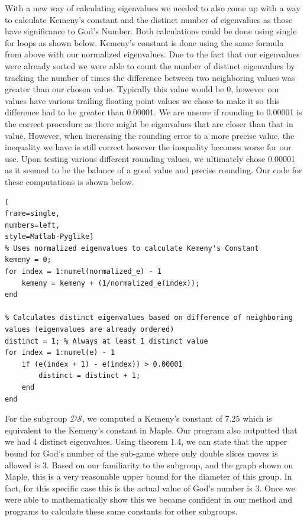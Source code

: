 \documentclass{article}
\begin{document}
With a new way of calculating eigenvalues we needed to also come up with a way to calculate Kemeny's constant and the distinct number of eigenvalues as those have significance to God's Number.  Both calculations could be done using single for loops as shown below.  Kemeny's constant is done using the same formula from above with our normalized eigenvalues.  Due to the fact that our eigenvalues were already sorted we were able to count the number of distinct eigenvalues by tracking the number of times the difference between two neighboring values was greater than our chosen value.  Typically this value would be 0, however our values have various trailing floating point values we chose to make it so this difference had to be greater than 0.00001.  We are unsure if rounding to 0.00001 is the correct procedure as there might be eigenvalues that are closer than that in value.  However, when increasing the rounding error to a more precise value, the inequality we have is still correct however the inequality becomes worse for our use.  Upon testing various different rounding values, we ultimately chose 0.00001 as it seemed to be the balance of a good value and precise rounding. Our code for these computations is shown below.
\begin{lstlisting}[
frame=single,
numbers=left,
style=Matlab-Pyglike]
% Uses normalized eigenvalues to calculate Kemeny's Constant
kemeny = 0;
for index = 1:numel(normalized_e) - 1
    kemeny = kemeny + (1/normalized_e(index));
end

% Calculates distinct eigenvalues based on difference of neighboring values (eigenvalues are already ordered)
distinct = 1; % Always at least 1 distinct value
for index = 1:numel(e) - 1
    if (e(index + 1) - e(index)) > 0.00001
        distinct = distinct + 1;
    end
end
\end{lstlisting}

For the subgroup $\mathcal{DS}$, we computed a Kemeny's constant of 7.25 which is equivalent to the Kemeny's constant in Maple.  Our program also outputted that we had 4 distinct eigenvalues.  Using theorem 1.4, we can state that the upper bound for God's number of the sub-game where only double slices moves is allowed is 3. Based on our familiarity to the subgroup, and the graph shown on Maple, this is a very reasonable upper bound for the diameter of this group.  In fact, for this specific case this is the actual value of God's number is 3.  Once we were able to mathematically show this we became confident in our method and programs to calculate these same constants for other subgroups.
\end{document}
